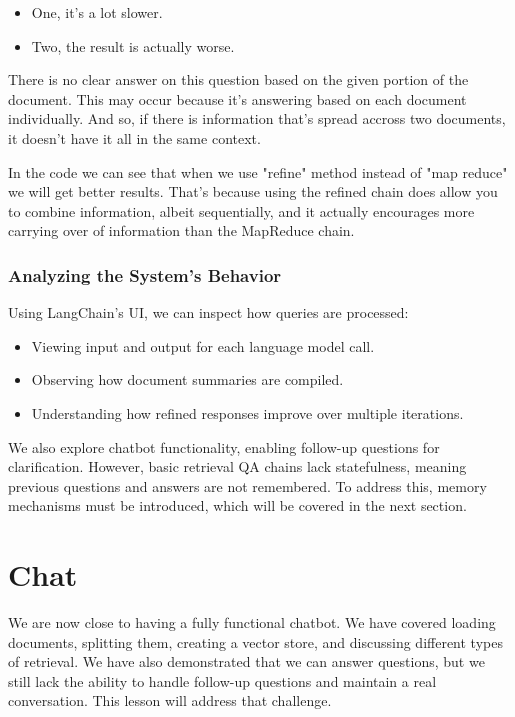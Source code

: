 \documentclass{article}
\begin{document}
\begin{itemize}
    \item One, it's a lot slower.
    \item Two, the result is actually worse.
\end{itemize}

There is no clear answer on this question based on the given portion of the document. This may occur because it's answering based on each document individually. And so, if there is information that's spread accross two documents, it doesn't have it all in the same context.

In the code we can see that when we use "refine" method instead of "map reduce" we will get better results. That's because using the refined chain does allow you to combine information, albeit sequentially, and it actually encourages more carrying over of information than the MapReduce chain.

\subsubsection{Analyzing the System's Behavior}

Using LangChain’s UI, we can inspect how queries are processed:
\begin{itemize}
    \item Viewing input and output for each language model call.
    \item Observing how document summaries are compiled.
    \item Understanding how refined responses improve over multiple iterations.
\end{itemize}

We also explore chatbot functionality, enabling follow-up questions for clarification. However, basic retrieval QA chains lack statefulness, meaning previous questions and answers are not remembered. To address this, memory mechanisms must be introduced, which will be covered in the next section.

\section{Chat}

We are now close to having a fully functional chatbot. We have covered loading documents, splitting them, creating a vector store, and discussing different types of retrieval. We have also demonstrated that we can answer questions, but we still lack the ability to handle follow-up questions and maintain a real conversation. This lesson will address that challenge.
\end{document}
